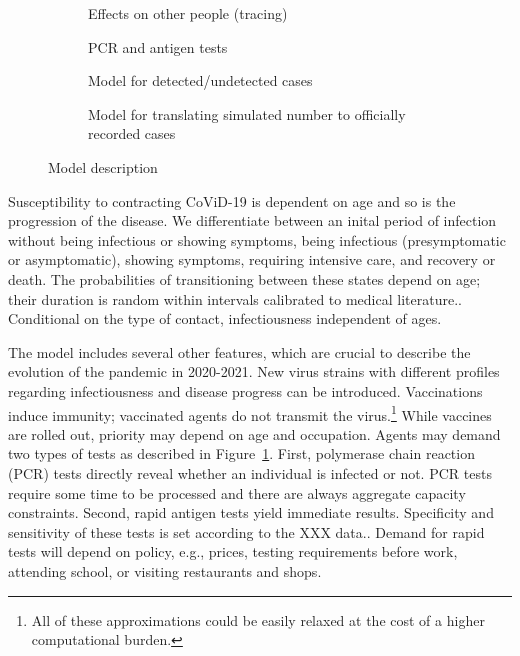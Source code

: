 \begin{figure}[!tp]
\begin{subfigure}[b]{0.475\textwidth}
        Effects on other people (tracing)

        \caption{{\small PCR and antigen tests}}
        \label{fig:pcr_antigen_tests}
    \end{subfigure}
    \begin{subfigure}[b]{0.475\textwidth}
        \centering

        Model for detected/undetected cases

        \caption{{\small Model for translating simulated number to officially recorded cases}}
        \label{fig:model_for_official_cases}
    \end{subfigure}

    \caption{Model description}
\end{figure}


Susceptibility to contracting CoViD-19 is dependent on age and so is the progression of the disease. We differentiate between an inital period of infection without being infectious or showing symptoms, being infectious (presymptomatic or asymptomatic), showing symptoms, requiring intensive care, and recovery or death. The probabilities of transitioning between these states depend on age; their duration is random within intervals calibrated to medical literature.. Conditional on the type of contact, infectiousness independent of ages.

The model includes several other features, which are crucial to describe the evolution of the pandemic in 2020-2021. New virus strains with different profiles regarding infectiousness and disease progress can be introduced. Vaccinations induce immunity; vaccinated agents do not transmit the virus.\footnote{All of these approximations could be easily relaxed at the cost of a higher computational burden.} While vaccines are rolled out, priority may depend on age and occupation. Agents may demand two types of tests as described in Figure~\ref{fig:pcr_antigen_tests}. First, polymerase chain reaction (PCR) tests directly reveal whether an individual is infected or not. PCR tests require some time to be processed and there are always aggregate capacity constraints. Second, rapid antigen tests yield immediate results. Specificity and sensitivity of these tests is set according to the XXX data.. Demand for rapid tests will depend on policy, e.g., prices, testing requirements before work, attending school, or visiting restaurants and shops.

